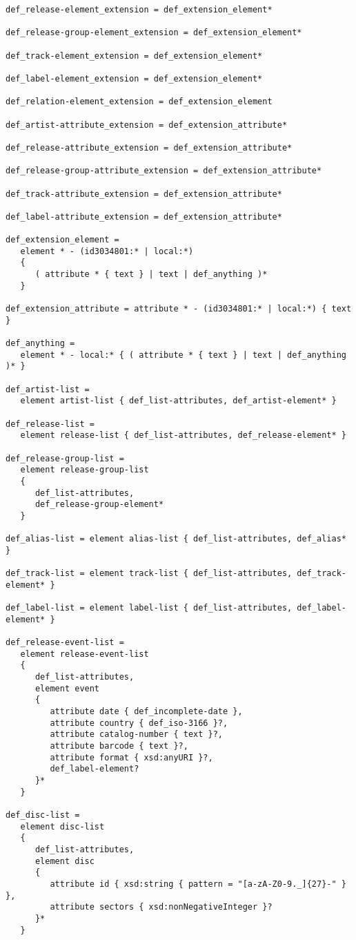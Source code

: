 \begin{Verbatim}[fontsize=\relsize{-2},frame=lines,framesep=.25in,label={[Schema Start]Schema End}]
def_release-element_extension = def_extension_element*

def_release-group-element_extension = def_extension_element*

def_track-element_extension = def_extension_element*

def_label-element_extension = def_extension_element*

def_relation-element_extension = def_extension_element

def_artist-attribute_extension = def_extension_attribute*

def_release-attribute_extension = def_extension_attribute*

def_release-group-attribute_extension = def_extension_attribute*

def_track-attribute_extension = def_extension_attribute*

def_label-attribute_extension = def_extension_attribute*

def_extension_element =
   element * - (id3034801:* | local:*)
   {
      ( attribute * { text } | text | def_anything )*
   }

def_extension_attribute = attribute * - (id3034801:* | local:*) { text }

def_anything =
   element * - local:* { ( attribute * { text } | text | def_anything )* }

def_artist-list =
   element artist-list { def_list-attributes, def_artist-element* }

def_release-list =
   element release-list { def_list-attributes, def_release-element* }

def_release-group-list =
   element release-group-list
   {
      def_list-attributes,
      def_release-group-element*
   }

def_alias-list = element alias-list { def_list-attributes, def_alias* }

def_track-list = element track-list { def_list-attributes, def_track-element* }

def_label-list = element label-list { def_list-attributes, def_label-element* }

def_release-event-list =
   element release-event-list
   {
      def_list-attributes,
      element event
      {
         attribute date { def_incomplete-date },
         attribute country { def_iso-3166 }?,
         attribute catalog-number { text }?,
         attribute barcode { text }?,
         attribute format { xsd:anyURI }?,
         def_label-element?
      }*
   }

def_disc-list =
   element disc-list
   {
      def_list-attributes,
      element disc
      {
         attribute id { xsd:string { pattern = "[a-zA-Z0-9._]{27}-" } },
         attribute sectors { xsd:nonNegativeInteger }?
      }*
   }


\end{Verbatim}
